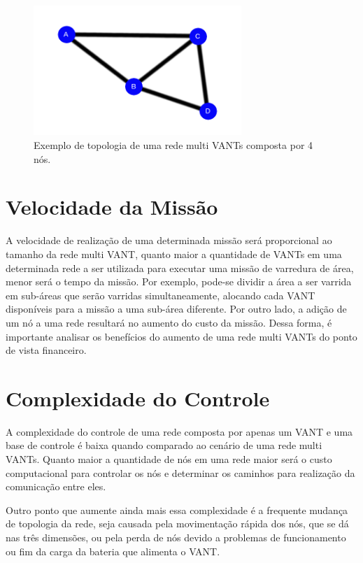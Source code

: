 \begin{figure} 
\center
\includegraphics[width=0.7\textwidth]{perdaNo.png}
\caption{Exemplo de topologia de uma rede multi VANTs composta por 4 nós.} 
\label{fig:perdaNo}
\end{figure} 

\section{Velocidade da Missão}

A velocidade de realização de uma determinada missão será proporcional ao tamanho da rede multi VANT, quanto maior a quantidade de VANTs em uma determinada rede a ser utilizada para executar uma missão de varredura de área, menor será o tempo da missão. Por exemplo, pode-se dividir a área a ser varrida em sub-áreas que serão varridas simultaneamente, alocando cada VANT disponíveis para a missão a uma sub-área diferente. Por outro lado, a adição de um nó a uma rede resultará no aumento do custo da missão. Dessa forma, é importante analisar os benefícios do aumento de uma rede multi VANTs do ponto de vista financeiro. 

\section{Complexidade do Controle}

A complexidade do controle de uma rede composta por apenas um VANT e uma base de controle é baixa quando comparado ao cenário de uma rede multi VANTs. Quanto maior a quantidade de nós em uma rede maior será o custo computacional para controlar os nós e determinar os caminhos para realização da comunicação entre eles.

Outro ponto que aumente ainda mais essa complexidade é a frequente mudança de topologia da rede, seja causada pela movimentação rápida dos nós, que se dá nas três dimensões, ou pela perda de nós devido a problemas de funcionamento ou fim da carga da bateria que alimenta o VANT.

